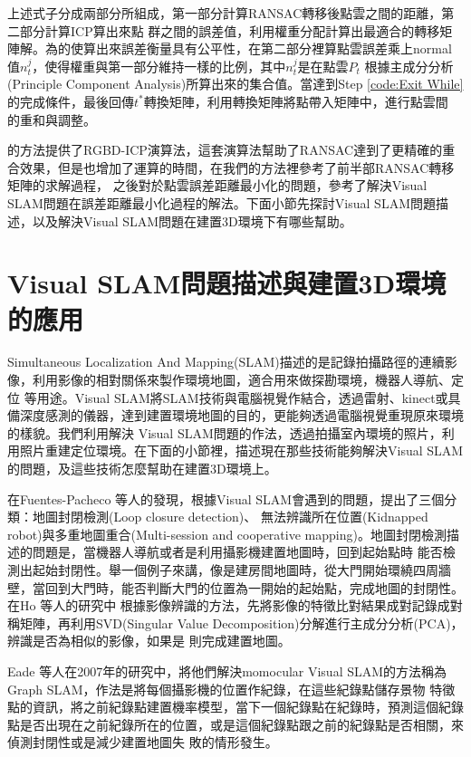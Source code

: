 	上述式子分成兩部分所組成，第一部分計算RANSAC轉移後點雲之間的距離，第二部分計算ICP算出來點
群之間的誤差值，利用權重分配計算出最適合的轉移矩陣解。為的使算出來誤差衡量具有公平性，在第二部分裡算點雲誤差乘上normal值${n_t^j}$，使得權重與第一部分維持一樣的比例，其中${n_t^j}$是在點雲$P_t$
根據主成分分析(Principle Component Analysis)所算出來的集合值。當達到Step \ref{code:Exit While} 的完成條件，最後回傳$t^*$轉換矩陣，利用轉換矩陣將點帶入矩陣中，進行點雲間
的重和與調整。

	\cite{Henry2012}的方法提供了RGBD-ICP演算法，這套演算法幫助了RANSAC達到了更精確的重合效果，但是也增加了運算的時間，在我們的方法裡參考了前半部RANSAC轉移矩陣的求解過程，
之後對於點雲誤差距離最小化的問題，參考了解決Visual SLAM問題在誤差距離最小化過程的解法。下面小節先探討Visual SLAM問題描述，以及解決Visual SLAM問題在建置3D環境下有哪些幫助。
	
\section{Visual SLAM問題描述與建置3D環境的應用}

	Simultaneous Localization And Mapping(SLAM)描述的是記錄拍攝路徑的連續影像，利用影像的相對關係來製作環境地圖，適合用來做探勘環境，機器人導航、定位
等用途。Visual SLAM將SLAM技術與電腦視覺作結合，透過雷射、kinect或具備深度感測的儀器，達到建置環境地圖的目的，更能夠透過電腦視覺重現原來環境的樣貌。我們利用解決
Visual SLAM問題的作法，透過拍攝室內環境的照片，利用照片重建定位環境。在下面的小節裡，描述現在那些技術能夠解決Visual SLAM的問題，及這些技術怎麼幫助在建置3D環境上。

	在Fuentes-Pacheco 等人的發現\cite{Fuentes-Pacheco2012}，根據Visual SLAM會遇到的問題，提出了三個分類：地圖封閉檢測(Loop closure detection)、
無法辨識所在位置(Kidnapped robot)與多重地圖重合(Multi-session and cooperative mapping)。地圖封閉檢測描述的問題是，當機器人導航或者是利用攝影機建置地圖時，回到起始點時
能否檢測出起始封閉性。舉一個例子來講，像是建房間地圖時，從大門開始環繞四周牆壁，當回到大門時，能否判斷大門的位置為一開始的起始點，完成地圖的封閉性。在Ho 等人的研究中
\cite{Ho2007}根據影像辨識的方法，先將影像的特徵比對結果成對記錄成對稱矩陣，再利用SVD(Singular Value Decomposition)分解進行主成分分析(PCA)，辨識是否為相似的影像，如果是
則完成建置地圖。

	Eade 等人在2007年的研究中\cite{Eade2007}，將他們解決momocular Visual SLAM的方法稱為Graph SLAM，作法是將每個攝影機的位置作紀錄，在這些紀錄點儲存景物
特徵點的資訊，將之前紀錄點建置機率模型，當下一個紀錄點在紀錄時，預測這個紀錄點是否出現在之前紀錄所在的位置，或是這個紀錄點跟之前的紀錄點是否相關，來偵測封閉性或是減少建置地圖失
敗的情形發生。

